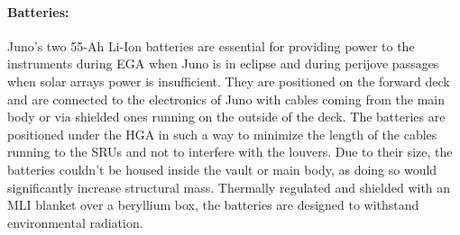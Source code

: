 \paragraph{Batteries:}Juno's two 55-Ah \cite{batteries_info} Li-Ion batteries are essential for providing power to the instruments during EGA when Juno is in eclipse and during perijove passages when solar arrays power is insufficient. \cite{batterie}
They are positioned on the forward deck and are connected to the electronics of Juno with cables coming from the main body or via shielded ones running on the outside of the deck.
The batteries are positioned under the HGA in such a way to minimize the length of the cables running to the SRUs and not to interfere with the louvers. \cite{batteries_position}
Due to their size, the batteries couldn't be housed inside the vault or main body, as doing so would significantly increase structural mass.
Thermally regulated and shielded with an MLI blanket over a beryllium box, the batteries are designed to withstand environmental radiation. \cite{batteries_position}